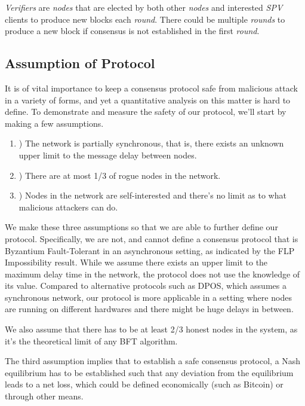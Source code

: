     \textit{Verifiers} are \textit{nodes} that are elected by both other \textit{nodes} and interested \textit{SPV} clients to produce new blocks each \textit{round}. There could be multiple \textit{rounds} to produce a new block if consensus is not established in the first \textit{round}.

\subsection{Assumption of Protocol}
    It is of vital importance to keep a consensus protocol safe from malicious attack in a variety of forms, and yet a quantitative analysis on this matter is hard to define. To demonstrate and measure the safety of our protocol, we'll start by making a few assumptions.
\begin{enumerate}
    \item ) The network is partially synchronous, that is, there exists an unknown upper limit to the message delay between nodes.
    \item ) There are at most 1/3 of rogue nodes in the network.
    \item ) Nodes in the network are self-interested and there's no limit as to what malicious attackers can do.
\end{enumerate}
    We make these three assumptions so that we are able to further define our protocol. Specifically, we are not, and cannot define a consensus protocol that is Byzantium Fault-Tolerant in an asynchronous setting, as indicated by the FLP Impossibility result. While we assume there exists an upper limit to the maximum delay time in the network, the protocol does not use the knowledge of its value. Compared to alternative protocols such as DPOS, which assumes a synchronous network, our protocol is more applicable in a setting where nodes are running on different hardwares and there might be huge delays in between.

    We also assume that there has to be at least 2/3 honest nodes in the system, as it's the theoretical limit of any BFT algorithm.

    The third assumption implies that to establish a safe consensus protocol, a Nash equilibrium has to be established such that any deviation from the equilibrium leads to a net loss, which could be defined economically (such as Bitcoin) or through other means.

